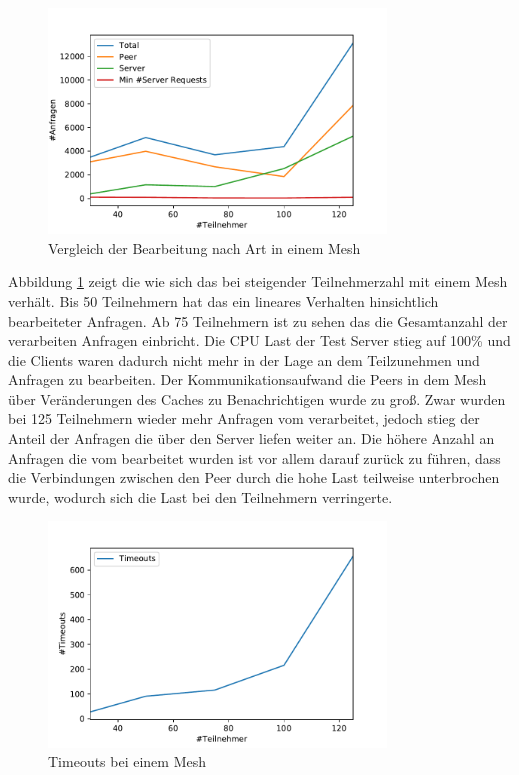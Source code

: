 \begin{figure}[!h]
	\centering
	\includegraphics[width=0.8\textwidth]{figures/single_mesh_line}
	\caption[A Figure Short-Title]{Vergleich der Bearbeitung nach Art in einem Mesh}
	\label{fig:single_mesh_line}
\end{figure}

Abbildung \ref{fig:single_mesh_line} zeigt die wie sich das \pTp \cdn bei steigender Teilnehmerzahl mit einem Mesh verhält. Bis 50 Teilnehmern hat das \cdn ein lineares Verhalten hinsichtlich bearbeiteter Anfragen. Ab 75 Teilnehmern ist zu sehen das die Gesamtanzahl der verarbeiten Anfragen einbricht. Die CPU Last der Test Server stieg auf 100\% und die Clients waren dadurch nicht mehr in der Lage an dem \cdn Teilzunehmen und Anfragen zu bearbeiten. Der Kommunikationsaufwand die Peers in dem Mesh über Veränderungen des Caches zu Benachrichtigen wurde zu groß. Zwar wurden bei 125 Teilnehmern wieder mehr Anfragen vom \cdn verarbeitet, jedoch stieg der Anteil der Anfragen die über den Server liefen weiter an. Die höhere Anzahl an Anfragen die vom \cdn bearbeitet wurden ist vor allem darauf zurück zu führen, dass die Verbindungen zwischen den Peer durch die hohe Last teilweise unterbrochen wurde, wodurch sich die Last bei den Teilnehmern verringerte.   

\begin{figure}[!h]
	\centering
	\includegraphics[width=0.8\textwidth]{figures/timeouts_single}
	\caption[A Figure Short-Title]{Timeouts bei einem Mesh}
	\label{fig:timeouts_single}
\end{figure}

